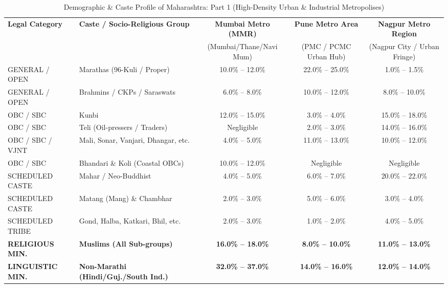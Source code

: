 \documentclass{article}
\begin{document}
\begin{table}[htbp]
\centering
\caption{Demographic \& Caste Profile of Maharashtra: Part 1 (High-Density Urban \& Industrial Metropolises)}
\label{tab:maharashtra_urban_hubs}
\small
\begin{tabular}{l p{5.5cm} c c c}
\toprule
\textbf{Legal Category} & \textbf{Caste / Socio-Religious Group} & \textbf{Mumbai Metro (MMR)} & \textbf{Pune Metro Area} & \textbf{Nagpur Metro Region} \\
 & & (Mumbai/Thane/Navi Mum) & (PMC / PCMC Urban Hub) & (Nagpur City / Urban Fringe) \\
\midrule
GENERAL / OPEN & Marathas (96-Kuli / Proper) & 10.0\% -- 12.0\% & 22.0\% -- 25.0\% & 1.0\% -- 1.5\% \\
GENERAL / OPEN & Brahmins / CKPs / Saraswats & 6.0\% -- 8.0\% & 10.0\% -- 12.0\% & 8.0\% -- 10.0\% \\
\addlinespace
OBC / SBC & Kunbi & 12.0\% -- 15.0\% & 3.0\% -- 4.0\% & 15.0\% -- 18.0\% \\
OBC / SBC & Teli (Oil-pressers / Traders) & Negligible & 2.0\% -- 3.0\% & 14.0\% -- 16.0\% \\
OBC / SBC / VJNT & Mali, Sonar, Vanjari, Dhangar, etc. & 4.0\% -- 5.0\% & 11.0\% -- 13.0\% & 10.0\% -- 12.0\% \\
OBC / SBC & Bhandari \& Koli (Coastal OBCs) & 10.0\% -- 12.0\% & Negligible & Negligible \\
\addlinespace
SCHEDULED CASTE & Mahar / Neo-Buddhist & 4.0\% -- 5.0\% & 6.0\% -- 7.0\% & 20.0\% -- 22.0\% \\
SCHEDULED CASTE & Matang (Mang) \& Chambhar & 2.0\% -- 3.0\% & 5.0\% -- 6.0\% & 3.0\% -- 4.0\% \\
\addlinespace
SCHEDULED TRIBE & Gond, Halba, Katkari, Bhil, etc. & 2.0\% -- 3.0\% & 1.0\% -- 2.0\% & 4.0\% -- 5.0\% \\
\addlinespace
\midrule
\textbf{RELIGIOUS MIN.} & \textbf{Muslims (All Sub-groups)} & \textbf{16.0\% -- 18.0\%} & \textbf{8.0\% -- 10.0\%} & \textbf{11.0\% -- 13.0\%} \\
\textbf{LINGUISTIC MIN.} & \textbf{Non-Marathi (Hindi/Guj./South Ind.)} & \textbf{32.0\% -- 37.0\%} & \textbf{14.0\% -- 16.0\%} & \textbf{12.0\% -- 14.0\%} \\
\bottomrule
\end{tabular}
\end{table}
\end{document}

